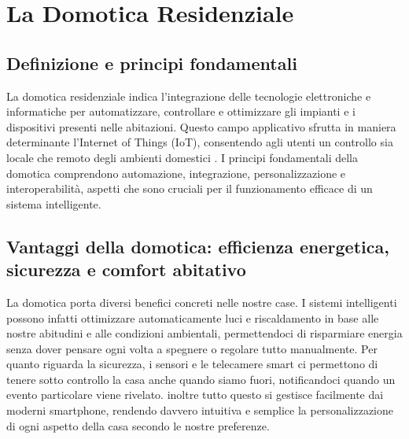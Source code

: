 \chapter{La Domotica Residenziale}

\section{Definizione e principi fondamentali}
La domotica residenziale indica l'integrazione delle tecnologie elettroniche e informatiche per automatizzare, controllare e ottimizzare gli impianti e i dispositivi presenti nelle abitazioni. Questo campo applicativo sfrutta in maniera determinante l'Internet of Things (IoT), consentendo agli utenti un controllo sia locale che remoto degli ambienti domestici \parencite{domoticaWiki}. I principi fondamentali della domotica comprendono automazione, integrazione, personalizzazione e interoperabilità, aspetti che sono cruciali per il funzionamento efficace di un sistema intelligente.

\section{Vantaggi della domotica: efficienza energetica, sicurezza e comfort abitativo}
La domotica porta diversi benefici concreti nelle nostre case. I sistemi intelligenti possono infatti ottimizzare automaticamente luci e riscaldamento in base alle nostre abitudini e alle condizioni ambientali, permettendoci di risparmiare energia senza dover pensare ogni volta a spegnere o regolare tutto manualmente.
Per quanto riguarda la sicurezza, i sensori e le telecamere smart ci permettono di tenere sotto controllo la casa anche quando siamo fuori, notificandoci quando un evento particolare viene rivelato. inoltre tutto questo si gestisce facilmente dai moderni smartphone, rendendo davvero intuitiva e semplice la personalizzazione di ogni aspetto della casa secondo le nostre preferenze.

